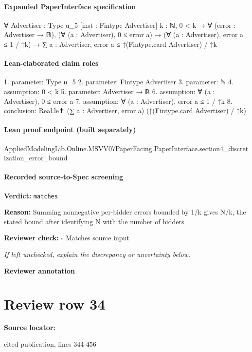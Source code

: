 \documentclass[10pt]{article}
\newcommand{\reviewerbox}{%
  \par\noindent\fbox{\parbox{0.96\linewidth}{\rule{0pt}{0.38in}}}\par
}
\newcommand{\reviewmatch}[1]{%
  \par\noindent\textbf{Reviewer check:} $\square$\; #1\par
  \noindent\emph{If left unchecked, explain the discrepancy or uncertainty below.}\par
}
\begin{document}
\paragraph{Expanded PaperInterface specification}
\begin{ReviewVerbatim}
∀ {Advertiser : Type u_5} [inst : Fintype Advertiser] {k : ℕ},
  0 < k →
    ∀ (error : Advertiser → ℝ),
      (∀ (a : Advertiser), 0 ≤ error a) →
        (∀ (a : Advertiser), error a ≤ 1 / ↑k) → ∑ a : Advertiser, error a ≤ ↑(Fintype.card Advertiser) / ↑k
\end{ReviewVerbatim}


\paragraph{Lean-elaborated claim roles}\begin{ReviewVerbatim}
1. parameter: Type u_5
2. parameter: Fintype Advertiser
3. parameter: ℕ
4. assumption: 0 < k
5. parameter: Advertiser → ℝ
6. assumption: ∀ (a : Advertiser), 0 ≤ error a
7. assumption: ∀ (a : Advertiser), error a ≤ 1 / ↑k
8. conclusion: Real.le✝ (∑ a : Advertiser, error a) (↑(Fintype.card Advertiser) / ↑k)
\end{ReviewVerbatim}

\paragraph{Lean proof endpoint (built separately)}\begin{ReviewVerbatim}
AppliedModelingLib.Online.MSVV07PaperFacing.PaperInterface.section4_discretization_error_bound
\end{ReviewVerbatim}

\paragraph{Recorded source-to-Spec screening}
\textbf{Verdict:} \texttt{matches}
\\
{\raggedright
\textbf{Reason:} Summing nonnegative per-\allowbreak{}bidder errors bounded by 1/\allowbreak{}k gives N/\allowbreak{}k, the stated bound after identifying N with the number of bidders.\allowbreak{}
\par}
\reviewmatch{Matches source input}
\noindent\textbf{Reviewer annotation}\par
\reviewerbox
\clearpage
\hypertarget{source-claim-65502edca00c2622}{}
\section*{Review row 34}
\textbf{Source locator:} {\footnotesize\raggedright cited publication, lines 344-\allowbreak{}456\par}
\end{document}
